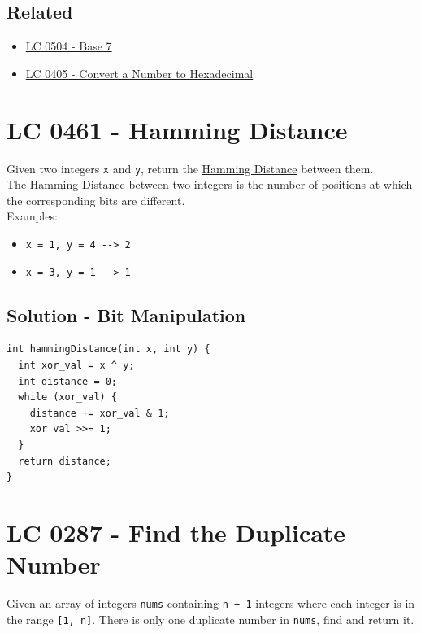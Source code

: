\subsection*{Related}
\begin{itemize}
\item \hyperref[lc0504]{LC 0504 - Base 7}
\item \hyperref[lc0405]{LC 0405 - Convert a Number to Hexadecimal}
\end{itemize}

\section{LC 0461 - Hamming Distance}
Given two integers {\colorbox{CodeBackground}{\lstinline|x|}} and {\colorbox{CodeBackground}{\lstinline|y|}}, return the \ul{Hamming Distance} between them.\\

The \ul{Hamming Distance} between two integers is the number of positions at which the corresponding bits are different.\\

Examples:
\begin{itemize}
\item {\colorbox{CodeBackground}{\lstinline|x = 1, y = 4 --> 2|}}
\item {\colorbox{CodeBackground}{\lstinline|x = 3, y = 1 --> 1|}}
\end{itemize}

\subsection*{Solution - Bit Manipulation}
\begin{lstlisting}
int hammingDistance(int x, int y) {
  int xor_val = x ^ y;
  int distance = 0;
  while (xor_val) {
    distance += xor_val & 1;
    xor_val >>= 1;
  }
  return distance;
}
\end{lstlisting}

\section{LC 0287 - Find the Duplicate Number}
Given an array of integers {\colorbox{CodeBackground}{\lstinline|nums|}} containing {\colorbox{CodeBackground}{\lstinline|n + 1|}} integers where each integer is in the range {\colorbox{CodeBackground}{\lstinline|[1, n]|}}. There is only one duplicate number in {\colorbox{CodeBackground}{\lstinline|nums|}}, find and return it.\\


